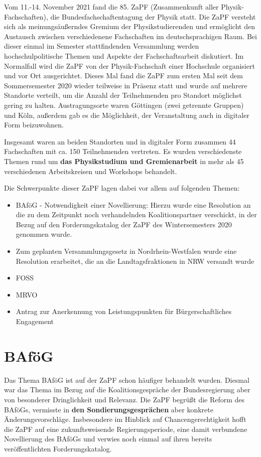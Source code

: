 Vom 11.-14. November 2021 fand die 85. ZaPF (Zusammenkunft aller Physik-Fachschaften), die Bundesfachschaftentagung der Physik statt. Die ZaPF versteht sich als meinungsäußerndes Gremium der Physikstudierenden und ermöglicht den Austausch zwischen verschiedenene Fachschaften im deutschsprachigen Raum. Bei dieser einmal im Semester stattfindenden Versammlung werden hochschulpolitische Themen und Aspekte der Fachschaftsarbeit diskutiert. Im Normalfall wird die ZaPF von der Physik-Fachschaft einer Hochschule organisiert und vor Ort ausgerichtet. Dieses Mal fand die ZaPF zum ersten Mal seit dem Sommersemester 2020 wieder teilweise in Präsenz statt und wurde auf mehrere Standorte verteilt, um die Anzahl der Teilnehmenden pro Standort möglichst gering zu halten. Austragungsorte waren Göttingen (zwei getrennte Gruppen) und Köln, außerdem gab es die Möglichkeit, der Veranstaltung auch in digitaler Form beizuwohnen. 

Insgesamt waren an beiden Standorten und in digitaler Form zusammen 44 Fachschaften mit ca. 150 Teilnehmenden vertreten. Es wurden verschiedenste Themen rund um \textbf{das Physikstudium und Gremienarbeit} in mehr als 45 verschiedenen Arbeitskreisen und Workshops behandelt.

Die Schwerpunkte dieser ZaPF lagen dabei vor allem auf folgenden Themen:
\begin{itemize}
\item \glqq BAföG - Notwendigkeit einer Novellierung\grqq : Hierzu wurde eine Resolution an die zu dem Zeitpunkt noch verhandelnden Koalitionspartner verschickt, in der Bezug auf den Forderungskatalog der ZaPF des Wintersemesters 2020 genommen wurde.
\item Zum geplanten Versammlungsgesetz in Nordrhein-Westfalen wurde eine Resolution erarbeitet, die an die Landtagsfraktionen in NRW versandt wurde
\item FOSS
\item MRVO
\item Antrag zur Anerkennung von Leistungspunkten für Bürgerschaftliches Engagement
\end{itemize}

\section*{BAföG}
Das Thema BAföG ist auf der ZaPF schon häufiger behandelt wurden. Diesmal war das Thema im Bezug auf die Koalitionsgespräche der Bundesregierung aber von besonderer Dringlichkeit und Relevanz. Die ZaPF begrüßt die Reform des BAföGs, vermisste in \textbf{den Sondierungsgesprächen} aber konkrete Änderungsvorschläge. Insbesondere im Hinblick auf Chancengerechtigkeit hofft die ZaPF auf eine zukunftsweisende Regierungsperiode, eine damit verbundene Novellierung des BAföGs und verwies noch einmal auf ihren bereits veröffentlichten Forderungskatalog. 

